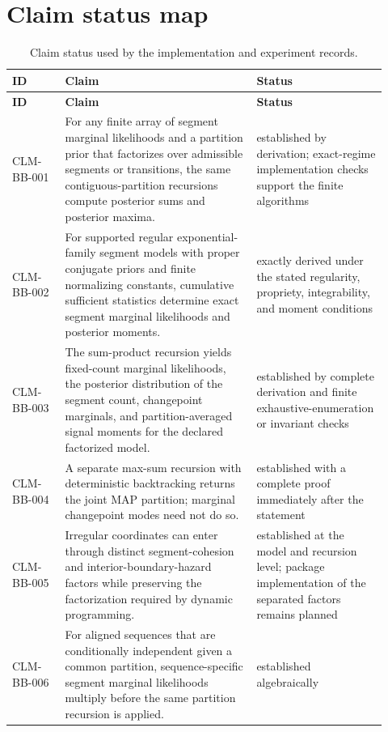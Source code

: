 \section{Claim status map}
\small
\begin{longtable}{@{}p{0.13\linewidth}p{0.47\linewidth}p{0.32\linewidth}@{}}
\caption{Claim status used by the implementation and experiment records.}\label{tab:handoff-claims}\\
\toprule
\textbf{ID} & \textbf{Claim} & \textbf{Status}\\
\midrule
\endfirsthead
\toprule
\textbf{ID} & \textbf{Claim} & \textbf{Status}\\
\midrule
\endhead
CLM-BB-001 & For any finite array of segment marginal likelihoods and a partition prior that factorizes over admissible segments or transitions, the same contiguous-partition recursions compute posterior sums and posterior maxima. & established by derivation; exact-regime implementation checks support the finite algorithms \\
CLM-BB-002 & For supported regular exponential-family segment models with proper conjugate priors and finite normalizing constants, cumulative sufficient statistics determine exact segment marginal likelihoods and posterior moments. & exactly derived under the stated regularity, propriety, integrability, and moment conditions \\
CLM-BB-003 & The sum-product recursion yields fixed-count marginal likelihoods, the posterior distribution of the segment count, changepoint marginals, and partition-averaged signal moments for the declared factorized model. & established by complete derivation and finite exhaustive-enumeration or invariant checks \\
CLM-BB-004 & A separate max-sum recursion with deterministic backtracking returns the joint MAP partition; marginal changepoint modes need not do so. & established with a complete proof immediately after the statement \\
CLM-BB-005 & Irregular coordinates can enter through distinct segment-cohesion and interior-boundary-hazard factors while preserving the factorization required by dynamic programming. & established at the model and recursion level; package implementation of the separated factors remains planned \\
CLM-BB-006 & For aligned sequences that are conditionally independent given a common partition, sequence-specific segment marginal likelihoods multiply before the same partition recursion is applied. & established algebraically \\

\end{longtable}
